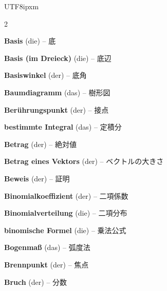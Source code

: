 \begin{CJK}{UTF8}{ipxm}
\begin{multicols}{2}
\par\nopagebreak
\textbf{Basis} (die) -- 底\dotfill\hyperref[e:43]{\pageref*{e:43}}\par
\textbf{Basis (im Dreieck)} (die) -- 底辺\dotfill\hyperref[e:183]{\pageref*{e:183}}\par
\textbf{Basiswinkel} (der) -- 底角\dotfill\hyperref[e:184]{\pageref*{e:184}}\par
\textbf{Baumdiagramm} (das) -- 樹形図\dotfill\hyperref[e:332]{\pageref*{e:332}}\par
\textbf{Berührungspunkt} (der) -- 接点\dotfill\hyperref[e:220]{\pageref*{e:220}}\par
\textbf{bestimmte Integral} (das) -- 定積分\dotfill\hyperref[e:288]{\pageref*{e:288}}\par
\textbf{Betrag} (der) -- 絶対値\dotfill\hyperref[e:53]{\pageref*{e:53}}\par
\textbf{Betrag eines Vektors} (der) -- ベクトルの大きさ\dotfill\hyperref[e:305]{\pageref*{e:305}}\par
\textbf{Beweis} (der) -- 証明\dotfill\hyperref[e:349]{\pageref*{e:349}}\par
\textbf{Binomialkoeffizient} (der) -- 二項係数\dotfill\hyperref[e:344]{\pageref*{e:344}}\par
\textbf{Binomialverteilung} (die) -- 二項分布\dotfill\hyperref[e:345]{\pageref*{e:345}}\par
\textbf{binomische Formel} (die) -- 乗法公式\dotfill\hyperref[e:93]{\pageref*{e:93}}\par
\textbf{Bogenmaß} (das) -- 弧度法\dotfill\hyperref[e:139]{\pageref*{e:139}}\par
\textbf{Brennpunkt} (der) -- 焦点\dotfill\hyperref[e:316]{\pageref*{e:316}}\par
\textbf{Bruch} (der) -- 分数\dotfill\hyperref[e:28]{\pageref*{e:28}}\par


\end{multicols}
\end{CJK}
